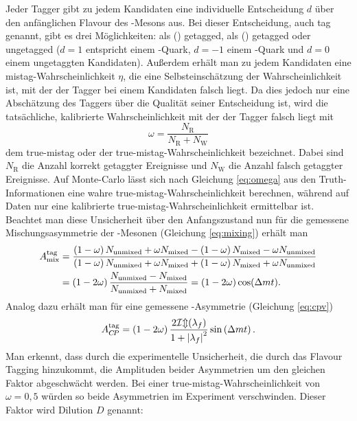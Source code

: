 Jeder Tagger gibt zu jedem Kandidaten eine individuelle Entscheidung $d$ über den anfänglichen Flavour des \B-Mesons aus. Bei dieser Entscheidung, auch tag genannt, gibt es drei Möglichkeiten: als \Bz (\bquarkbar\dquark) getagged, als \Bzb (\bquark\dquarkbar) getagged oder ungetagged ($d=1$ entspricht einem \bquarkbar-Quark, $d=-1$ einem \bquark-Quark und $d=0$ einem ungetaggten Kandidaten). Außerdem erhält man zu jedem Kandidaten eine mistag-Wahrscheinlichkeit $\eta$, die eine Selbsteinschätzung der Wahrscheinlichkeit ist, mit der der Tagger bei einem Kandidaten falsch liegt. Da dies jedoch nur eine Abschätzung des Taggers über die Qualität seiner Entscheidung ist, wird die tatsächliche, kalibrierte Wahrscheinlichkeit mit der der Tagger falsch liegt mit 
\begin{equation}
\omega=\frac{N_{\text{R}}}{N_{\text{R}}+N_{\text{W}}}\label{eq:omega}
\end{equation}
dem true-mistag oder der true-mistag-Wahrscheinlichkeit bezeichnet. Dabei sind $N_{\text{R}}$ die Anzahl korrekt getaggter Ereignisse und $N_{\text{W}}$ die Anzahl falsch getaggter Ereignisse. Auf Monte-Carlo lässt sich nach Gleichung \eqref{eq:omega} aus den Truth-Informationen eine wahre true-mistag-Wahrscheinlichkeit berechnen, während auf Daten nur eine kalibrierte true-mistag-Wahrscheinlichkeit ermittelbar ist. Beachtet man diese Unsicherheit über den Anfangszustand nun für die gemessene Mischungsasymmetrie der \B-Mesonen (Gleichung \eqref{eq:mixing}) erhält man
\begin{equation}
\begin{split}
A_{\text{mix}}^{\text{tag}}&=\frac{\left(1-\omega\right)N_\text{unmixed}+\omega N_\text{mixed}-\left(1-\omega\right)N_\text{mixed}-\omega N_\text{unmixed}}{\left(1-\omega\right)N_\text{unmixed}+\omega N_\text{mixed}+\left(1-\omega\right)N_\text{mixed}+\omega N_\text{unmixed}}\\
&=\left(1-2\omega\right)\frac{N_\text{unmixed}-N_\text{mixed}}{N_\text{unmixed}+N_\text{mixed}}=\left(1-2\omega\right)\cos({\Delta m} t).\label{eq:mischung}
\end{split}
\end{equation}
Analog dazu erhält man für eine gemessene \CP-Asymmetrie (Gleichung \eqref{eq:cpv})
\begin{equation}
A_{C\!P}^{\text{tag}}=\left(1-2\omega\right)\frac{2\mathcal{Im}(\lambda_f)}{1+\left|\lambda_f\right|^2}\sin\left({\Delta m} t\right).
\end{equation}
Man erkennt, dass durch die experimentelle Unsicherheit, die durch das Flavour Tagging hinzukommt, die Amplituden beider Asymmetrien um den gleichen Faktor abgeschwächt werden. Bei einer true-mistag-Wahrscheinlichkeit von $\omega=0{,}5$ würden so beide Asymmetrien im Experiment verschwinden. Dieser Faktor wird Dilution $D$ genannt: 
